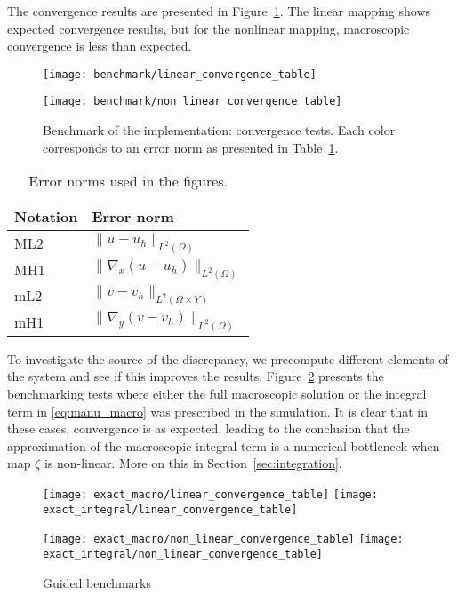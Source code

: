\documentclass{article}
\begin{document}
The convergence results are presented in Figure~\ref{fig:benchmark}. The linear mapping shows expected convergence results, but for the nonlinear mapping, macroscopic convergence is less than expected.
\begin{figure}[h!]
    \centering
    \begin{minipage}{.45\textwidth}
        \texttt{[image: benchmark/linear\_convergence\_table]}
    \end{minipage}%
    \begin{minipage}{.45\textwidth}
        \texttt{[image: benchmark/non\_linear\_convergence\_table]}
    \end{minipage}
    \caption{Benchmark of the implementation: convergence tests. Each color corresponds to an error norm as presented in Table~\ref{tab:errors}.}
    \label{fig:benchmark}
\end{figure}

\begin{table}[h!]
    \centering
\begin{tabular}{l|l}
Notation & Error norm                             \\ \hline
ML2      & $\|u - u_h\|_{L^2(\Omega)}$            \\
MH1      & $\|\nabla_x (u - u_h)\|_{L^2(\Omega)}$ \\
mL2      & $\|v - v_h\|_{L^2(\Omega \times Y)}$   \\
mH1      & $\|\nabla_y (v - v_h)\|_{L^2(\Omega)}$
\end{tabular}
\label{tab:errors}
\caption{Error norms used in the figures.}
\end{table}
To investigate the source of the discrepancy, we precompute different elements of the system and see if this improves the results.
Figure~\ref{fig:aided_benchmark} presents the benchmarking tests where either the full macroscopic solution or the integral term in \eqref{eq:manu_macro} was prescribed in the simulation.
It is clear that in these cases, convergence is as expected, leading to the conclusion that the approximation of the macroscopic integral term is a numerical bottleneck when map $\zeta$ is non-linear. More on this in Section~\ref{sec:integration}.
\begin{figure}[h!]
    \centering
    \begin{minipage}{.45\textwidth}
        \texttt{[image: exact\_macro/linear\_convergence\_table]}
        \texttt{[image: exact\_integral/linear\_convergence\_table]}
    \end{minipage}%
    \begin{minipage}{.45\textwidth}
        \texttt{[image: exact\_macro/non\_linear\_convergence\_table]}
        \texttt{[image: exact\_integral/non\_linear\_convergence\_table]}
    \end{minipage}
    \caption{Guided benchmarks}
    \label{fig:aided_benchmark}
\end{figure}
\end{document}
